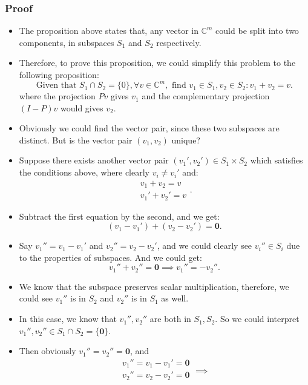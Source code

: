   \subsubsection*{Proof}%
\begin{itemize}
  \item The proposition above states that, any vector in $\mathbb{C}^{m}$ could be split into two components, in subspaces $S_1$ and $S_2$ respectively.
  \item Therefore, to prove this proposition, we could simplify this problem to the following proposition:
    \[
    \text{Given that } S_1 \cap S_2 = \{0\}, \forall v \in \mathbb{C}^{m}, \text{ find } v_1 \in S_1, v_2 \in S_2: v_1 + v_2 = v 
    .\]
    where the projection $Pv$ gives $v_1$ and the complementary projection $(I - P)v$ would gives $v_2$.
  \item Obviously we could find the vector pair, since these two subspaces are distinct. But is the vector pair $(v_1, v_2)$ unique?
  \item Suppose there exists another vector pair $(v_1', v_2') \in S_1 \times S_2$ which satisfies the conditions above, where clearly $v_i \neq v_i'$ and:
    \[
      \begin{array}{l}
      v_1 + v_2 = v \\
      v_1' + v_2' = v
      \end{array}
    .\] 
\item Subtract the first equation by the second, and we get:
  \[
    (v_1 - v_1') + (v_2  - v_2') = \textbf{0} 
  .\] 
\item Say $v_1'' = v_1 - v_1'$ and $v_2'' = v_2 - v_2'$, and we could clearly see $v_i'' \in S_i$ due to the properties of subspaces. And we could get:
  \[
  v_1'' + v_2'' = \textbf{0} \implies v_1'' = -v_2''
  .\]
 \item We know that the subspace preserves scalar multiplication, therefore, we could see $v_1''$ is in $S_2$ and  $v_2''$ is in $S_1$ as well.
  \item In this case, we know that $v_1'', v_2''$ are both in $S_1, S_2$. So we could interpret $v_1'', v_2'' \in S_1 \cap S_2 = \{\textbf{0}\} $.
  \item Then obviously $v_1'' = v_2'' = \textbf{0}$, and
    \[
      \begin{array}{l}
      v_1'' = v_1 - v_1' = \textbf{0} \\
      v_2'' = v_2 - v_2' = \textbf{0} \\
      \end{array}
    \implies 
\]
\end{itemize}
